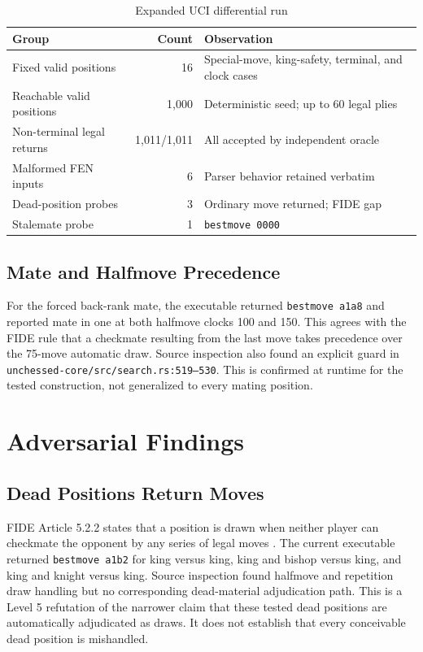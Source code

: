 \documentclass[conference]{IEEEtran}
\begin{document}
\begin{table}[t]
\caption{Expanded UCI differential run}
\label{tab:uci}
\centering
\begin{tabularx}{\columnwidth}{@{}l r X@{}}
\toprule
Group & Count & Observation \\
\midrule
Fixed valid positions & 16 & Special-move, king-safety, terminal, and clock cases \\
Reachable valid positions & 1,000 & Deterministic seed; up to 60 legal plies \\
Non-terminal legal returns & 1,011/1,011 & All accepted by independent oracle \\
Malformed FEN inputs & 6 & Parser behavior retained verbatim \\
Dead-position probes & 3 & Ordinary move returned; FIDE gap \\
Stalemate probe & 1 & \texttt{bestmove 0000} \\
\bottomrule
\end{tabularx}
\end{table}

\subsection{Mate and Halfmove Precedence}
For the forced back-rank mate, the executable returned \texttt{bestmove a1a8} and reported mate in one at both halfmove clocks 100 and 150. This agrees with the FIDE rule that a checkmate resulting from the last move takes precedence over the 75-move automatic draw. Source inspection also found an explicit guard in \texttt{unchessed-core/src/search.rs:519--530}. This is confirmed at runtime for the tested construction, not generalized to every mating position.

\section{Adversarial Findings}
\subsection{Dead Positions Return Moves}
FIDE Article 5.2.2 states that a position is drawn when neither player can checkmate the opponent by any series of legal moves \cite{fide}. The current executable returned \texttt{bestmove a1b2} for king versus king, king and bishop versus king, and king and knight versus king. Source inspection found halfmove and repetition draw handling but no corresponding dead-material adjudication path. This is a Level 5 refutation of the narrower claim that these tested dead positions are automatically adjudicated as draws. It does not establish that every conceivable dead position is mishandled.
\end{document}
